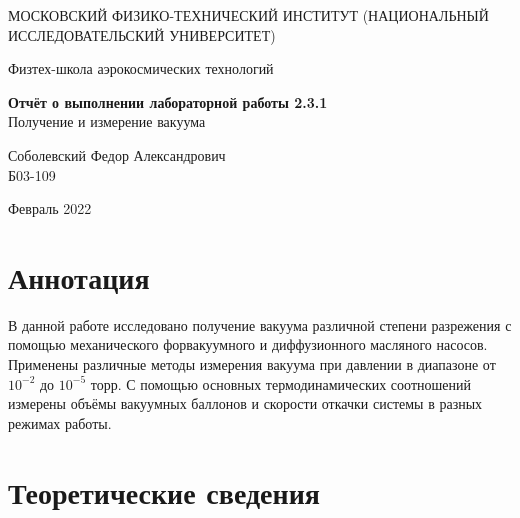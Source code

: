 \documentclass[a4paper,12pt]{article} %
\date{\today}
\begin{document}

\begin{titlepage} %
	\begin{center}
		{\large МОСКОВСКИЙ ФИЗИКО-ТЕХНИЧЕСКИЙ ИНСТИТУТ (НАЦИОНАЛЬНЫЙ ИССЛЕДОВАТЕЛЬСКИЙ УНИВЕРСИТЕТ)}
	\end{center}
	\begin{center}
		{\large Физтех-школа аэрокосмических технологий}
	\end{center}
	
	
	\vspace{4.5cm}
	{\huge
		\begin{center}
			{\bf Отчёт о выполнении лабораторной работы 2.3.1}\\
			Получение и измерение вакуума
		\end{center}
	}
	\vspace{1cm}
	\begin{center}
		{\large Соболевский Федор Александрович \\
			\vspace{0.2cm}
			Б03-109}
	\end{center}
	\vspace{8cm}
	\begin{center}
		Февраль 2022
	\end{center}
\end{titlepage} %

\section{Аннотация} 

В данной работе исследовано получение вакуума различной степени разрежения с помощью механического форвакуумного и диффузионного масляного насосов. Применены различные методы измерения вакуума при давлении в диапазоне от $ 10^{-2} $ до $ 10^{-5} $ торр. С помощью основных термодинамических соотношений измерены объёмы вакуумных баллонов и скорости откачки системы в разных режимах работы. 

\section{Теоретические сведения}
\end{document}
